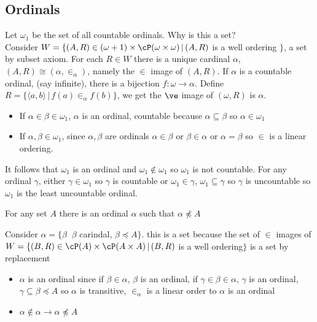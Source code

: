 
\subsection{Ordinals}

Let $\omega_1$ be the set of all countable ordinals. Why is this a set? \\
Consider $W = \{ (A, R) \in (\omega + 1) \times \cP(\omega \times \omega) \, | \, (A, R)$ is a well ordering $\}$, a set by subset axiom. For each $R \in W$ there is a unique cardinal $\alpha$, $(A, R) \cong (\alpha, \in_{\alpha})$, namely the $\in$ image of $(A, R)$. If $\alpha$ is a countable ordinal, (say infinite), there is a bijection $f: \omega \to \alpha$. Define $R = \{ \langle a, b \rangle \, | \, f(a) \in_{\alpha} f(b)\}$, we get the $\ve$ image of $(\omega, R)$ is $\alpha$. 

\begin{itemize}
    \item If $\alpha \in \beta \in \omega_1$, $\alpha$ is an ordinal, countable because $\alpha \subseteq \beta$ so $\alpha \in \omega_1$
    \item If $\alpha, \beta \in \omega_1$, since $\alpha, \beta$ are ordinals $\alpha \in \beta$ or $\beta \in \alpha$ or $\alpha = \beta$ so $\in$ is a linear ordering. 
\end{itemize}
It follows that $\omega_1$ is an ordinal and $\omega_1 \not\in \omega_1$ so $\omega_1$ is not countable. For any ordinal $\gamma$, either $\gamma \in \omega_1$ so $\gamma$ is countable or $\omega_1 \in \gamma$, $\omega_1 \subseteq \gamma$ so $\gamma$ is uncountable so $\omega_1$ is the least uncountable ordinal. 

\begin{theorem}
    For any set $A$ there is an ordinal $\alpha$ such that $\alpha \not\preceq A$ 
\end{theorem}

\begin{pf}
    Consider $\alpha = \{ \beta \, \ \, \beta$ carindal, $\beta \preceq A\}$. this is a set because the set of $\in$ images of $W = \{ (B, R) \in \cP(A) \times \cP(A \times A) \, | \, (B,R)$ is a well ordering$\}$ is a set by replacement
    \begin{itemize}
        \item $\alpha$ is an ordinal since if $\beta \in \alpha$, $\beta$ is an ordinal, if $\gamma \in \beta \in \alpha$, $\gamma$ is an ordinal, $\gamma \subseteq \beta \preceq A$ so $\alpha$ is transitive, $\in_{\alpha}$ is a linear order to $\alpha$ is an ordinal 
        \item $\alpha \not\in \alpha \to \alpha \not\preceq A$ 
    \end{itemize}
\end{pf}    

